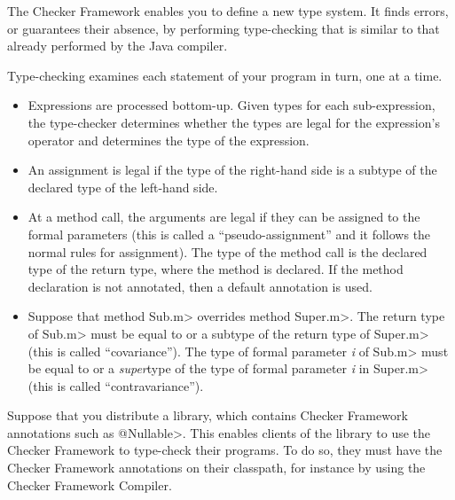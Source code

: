 


The Checker Framework enables you to define a new type system.  It finds
errors, or guarantees their absence, by performing type-checking that is
similar to that already performed by the Java compiler.

Type-checking examines each statement of your program in turn, one at a time.
\begin{itemize}
\item
Expressions are processed bottom-up.  Given types for each sub-expression,
the type-checker determines whether the types are legal for the
expression's operator and determines the type of the expression.

\item
An assignment is legal if the type of the right-hand side is a subtype of
the declared type of the left-hand side.

\item
 At a method call, the arguments are legal if they can be assigned to the
 formal parameters (this is called a ``pseudo-assignment'' and it follows
 the normal rules for assignment).  The type of the method call is the
 declared type of the return type, where the method is declared.  If
 the method declaration is not annotated, then a default annotation is
 used.

\item
  Suppose that method \<Sub.m> overrides method \<Super.m>.
  The return type of \<Sub.m> must be equal to or a subtype of the return
  type of \<Super.m> (this is called ``covariance'').
  The type of formal parameter \textit{i} of \<Sub.m> must be equal to or a
  \emph{super}type of the type of formal parameter \textit{i} in \<Super.m> (this
  is called ``contravariance'').

\end{itemize}



Suppose that you distribute a library, which contains Checker Framework
annotations such as \<@Nullable>.  This enables clients of the library to
use the Checker Framework to type-check their programs.  To do so, they
must have the Checker Framework annotations on their classpath, for
instance by using the Checker Framework Compiler.

